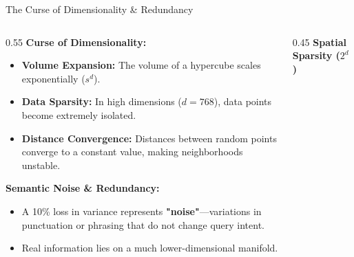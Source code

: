 \documentclass[9pt]{beamer}
\begin{document}
\begin{frame}{The Curse of Dimensionality \& Redundancy}
    \begin{columns}
        \begin{column}{0.55\textwidth}
            \textbf{Curse of Dimensionality:}
            \begin{itemize}
                \item \textbf{Volume Expansion:} The volume of a hypercube scales exponentially ($s^d$).
                \item \textbf{Data Sparsity:} In high dimensions ($d=768$), data points become extremely isolated.
                \item \textbf{Distance Convergence:} Distances between random points converge to a constant value, making neighborhoods unstable.
            \end{itemize}
               \vspace{0.45cm}
            \textbf{Semantic Noise \& Redundancy:}
            \begin{itemize}
                \item A 10\% loss in variance represents \textbf{"noise"}—variations in punctuation or phrasing that do not change query intent.
                \item Real information lies on a much lower-dimensional manifold.
            \end{itemize}
        \end{column}
        
        \begin{column}{0.45\textwidth}
            \centering
            \textbf{\small Spatial Sparsity ($2^d$)}
            \vspace{0.2cm}
            
\end{column}
\end{columns}
\end{frame}
\end{document}
